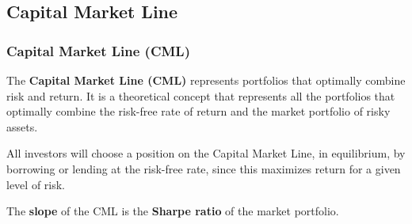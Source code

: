 \documentclass{beamer}
\begin{document}




\subsection{Capital Market Line}

\begin{frame}
\frametitle{\textbf{Capital Market Line (CML)}}

\begin{definition}
\justifying
The \textbf{Capital Market Line (CML)} represents portfolios that optimally combine risk and return. It is a theoretical concept that represents all the portfolios that optimally combine the risk-free rate of return and the market portfolio of risky assets.
\end{definition}

\vspace{0.8cm}
\justifying
All investors will choose a position on the Capital Market Line, in equilibrium, by borrowing or lending at the risk-free rate, since this maximizes return for a given level of risk.

\vspace{0.8cm}
\justifying
The \textbf{slope} of the CML is the \textbf{Sharpe ratio} of the market portfolio.

\end{frame}
\end{document}

